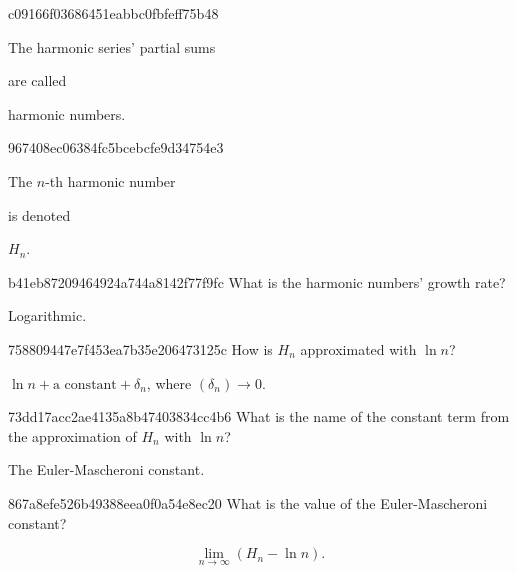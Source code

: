 \begin{note}{c09166f03686451eabbc0fbfeff75b48}
    \begin{icloze}{2}The harmonic series' partial sums\end{icloze} are called \begin{icloze}{1}harmonic numbers.\end{icloze}
\end{note}

\begin{note}{967408ec06384fc5bcebcfe9d34754e3}
    \begin{icloze}{2}The \({ n }\)-th harmonic number\end{icloze} is denoted \begin{icloze}{1}\({ H_n }\).\end{icloze}
\end{note}

\begin{note}{b41eb87209464924a744a8142f77f9fc}
    What is the harmonic numbers' growth rate?

    \begin{cloze}{1}
        Logarithmic.
    \end{cloze}
\end{note}

\begin{note}{758809447e7f453ea7b35e206473125c}
    How is \({ H_n }\) approximated with \({ \ln n }\)?

    \begin{cloze}{1}
        \({ \ln n + \text{a constant} + \delta_n }\), \quad where \({ (\delta_n) \to 0 }\).
    \end{cloze}
\end{note}

\begin{note}{73dd17acc2ae4135a8b47403834cc4b6}
    What is the name of the constant term from the approximation of \({ H_n }\) with \({ \ln n }\)?

    \begin{cloze}{1}
        The Euler-Mascheroni constant.
    \end{cloze}
\end{note}

\begin{note}{867a8efe526b49388eea0f0a54e8ec20}
    What is the value of the Euler-Mascheroni constant?

    \begin{cloze}{1}
        \[
            \lim_{n \to \infty} (H_n - \ln n).
        \]
    \end{cloze}
\end{note}

